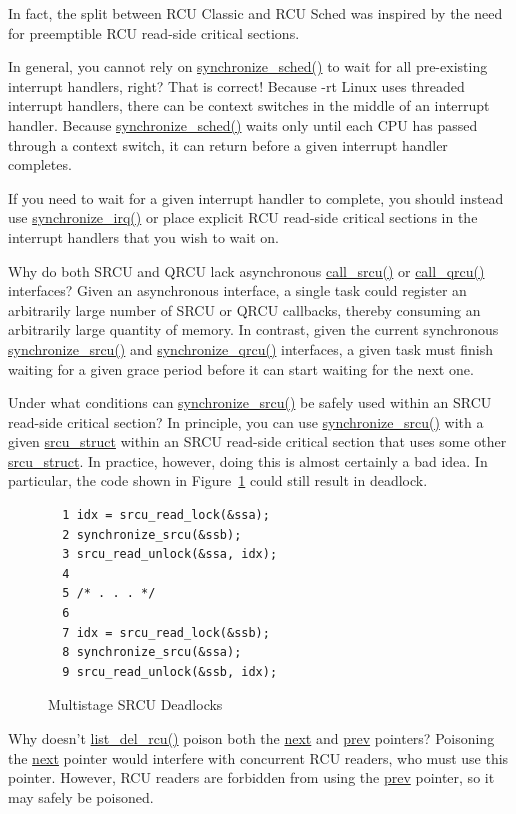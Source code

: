 	In fact, the split between RCU Classic and RCU Sched was inspired
	by the need for preemptible RCU read-side critical sections.

\QuickQ{}
	In general, you cannot rely on \url{synchronize_sched()} to
	wait for all pre-existing interrupt handlers,
	right?
\QuickA{}
	That is correct!
	Because -rt Linux uses threaded interrupt handlers, there can
	be context switches in the middle of an interrupt handler.
	Because \url{synchronize_sched()} waits only until each
	CPU has passed through a context switch, it can return
	before a given interrupt handler completes.

	If you need to wait for a given interrupt handler to complete,
	you should instead use \url{synchronize_irq()} or place
	explicit RCU read-side critical sections in the interrupt
	handlers that you wish to wait on.

\QuickQ{}
	Why do both SRCU and QRCU lack asynchronous \url{call_srcu()}
	or \url{call_qrcu()} interfaces?
\QuickA{}
	Given an asynchronous interface, a single task
	could register an arbitrarily large number of SRCU or QRCU callbacks,
	thereby consuming an arbitrarily large quantity of memory.
	In contrast, given the current synchronous
	\url{synchronize_srcu()} and \url{synchronize_qrcu()}
	interfaces, a given task must finish waiting for a given grace period
	before it can start waiting for the next one.

\QuickQ{}
	Under what conditions can \url{synchronize_srcu()} be safely
	used within an SRCU read-side critical section?
\QuickA{}
	In principle, you can use
	\url{synchronize_srcu()} with a given \url{srcu_struct}
	within an SRCU read-side critical section that uses some other
	\url{srcu_struct}.
	In practice, however, doing this is almost certainly a bad idea.
	In particular, the code shown in
	Figure~\ref{fig:defer:Multistage SRCU Deadlocks}
	could still result in deadlock.

\begin{figure}[htbp]
{ \centering
\begin{verbatim}
  1 idx = srcu_read_lock(&ssa);
  2 synchronize_srcu(&ssb);
  3 srcu_read_unlock(&ssa, idx);
  4
  5 /* . . . */
  6
  7 idx = srcu_read_lock(&ssb);
  8 synchronize_srcu(&ssa);
  9 srcu_read_unlock(&ssb, idx);
\end{verbatim}
}
\caption{Multistage SRCU Deadlocks}
\label{fig:defer:Multistage SRCU Deadlocks}
\end{figure}


\QuickQ{}
	Why doesn't \url{list_del_rcu()} poison both the \url{next}
	and \url{prev} pointers?
\QuickA{}
	Poisoning the \url{next} pointer would interfere
	with concurrent RCU readers, who must use this pointer.
	However, RCU readers are forbidden from using the \url{prev}
	pointer, so it may safely be poisoned.

